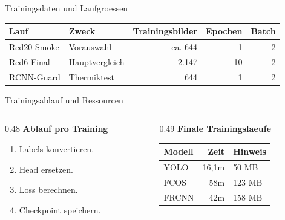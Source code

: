 \begin{frame}{Trainingsdaten und Laufgroessen}
\scriptsize
\begin{tabular}{l l r r r}
\toprule
Lauf & Zweck & Trainingsbilder & Epochen & Batch \\
\midrule
Red20-Smoke & Vorauswahl & ca. 644 & 1 & 2 \\
Red6-Final & Hauptvergleich & 2.147 & 10 & 2 \\
RCNN-Guard & Thermiktest & 644 & 1 & 2 \\
\bottomrule
\end{tabular}
\end{frame}

\begin{frame}{Trainingsablauf und Ressourcen}
\scriptsize
\begin{columns}[T,onlytextwidth]
\begin{column}{0.48\textwidth}
\textbf{Ablauf pro Training}
\begin{enumerate}\setlength\itemsep{0.10em}
    \item Labels konvertieren.
    \item Head ersetzen.
    \item Loss berechnen.
    \item Checkpoint speichern.
\end{enumerate}
\end{column}
\begin{column}{0.49\textwidth}
\textbf{Finale Trainingslaeufe}
\begin{tabular}{@{}l r l@{}}
\toprule
Modell & Zeit & Hinweis \\
\midrule
YOLO & 16,1m & 50 MB \\
FCOS & 58m & 123 MB \\
FRCNN & 42m & 158 MB \\
\bottomrule
\end{tabular}
\end{column}
\end{columns}
\end{frame}


